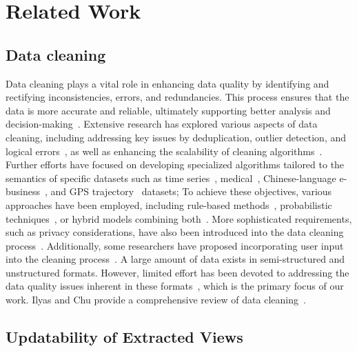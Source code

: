 \section{Related Work}
\subsection{Data cleaning}
Data cleaning plays a vital role in enhancing data quality by identifying and rectifying inconsistencies, errors, and redundancies. This process ensures that the data is more accurate and reliable, ultimately supporting better analysis and  decision-making~\cite{DBLP:reference/bdt/Chu19}.   Extensive research has explored various aspects of data cleaning, including addressing key issues by  deduplication, outlier detection, and logical errors~\cite{DBLP:books/acm/IlyasC19}, as well as enhancing the scalability of cleaning algorithms~\cite{DBLP:phd/basesearch/Saxena21}. Further efforts have focused on developing specialized algorithms tailored to the semantics of specific datasets such as time series~\cite{DBLP:journals/pvldb/DingWSLLG19}, medical~\cite{DBLP:conf/cbms/DeshpandeRTFRA20}, Chinese-language e-business~\cite{5917038}, and GPS  trajectory~\cite{DBLP:conf/dasfaa/LiCLB20} datasets; To achieve these objectives, various approaches have been employed, including  rule-based methods~\cite{DBLP:phd/us/Ebaid19, DBLP:conf/icde/ChuIP13}, probabilistic techniques~\cite{DBLP:conf/icde/QinHWZZM0O024,DBLP:journals/fcsc/LiLLC19}, or hybrid models combining both~\cite{DBLP:journals/pvldb/RekatsinasCIR17}. More sophisticated requirements, such as privacy considerations, have also been introduced into the data cleaning process~\cite{DBLP:journals/is/HuangMC20}. Additionally, some researchers have proposed incorporating user input into the cleaning process~\cite{DBLP:journals/jdiq/PereiraFLG24}. A large amount of data exists in semi-structured and unstructured formats. However, limited effort has been devoted to addressing the data quality issues inherent in these formats~\cite{DBLP:journals/pvldb/ChuI16}, which is the primary focus of our work.   Ilyas and Chu provide a comprehensive review of data cleaning~\cite{DBLP:books/acm/IlyasC19}.



\subsection{Updatability of Extracted Views} 

